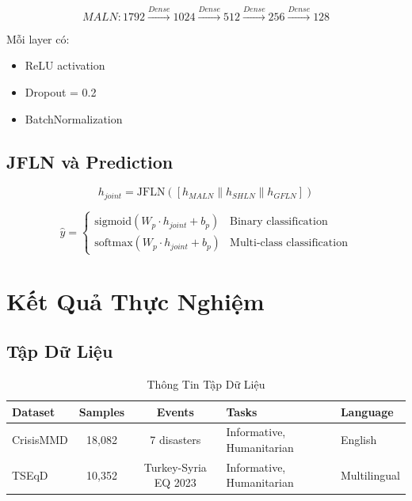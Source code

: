 \documentclass[12pt,a4paper]{article}
\begin{document}
\begin{equation}
MALN: 1792 \xrightarrow{Dense} 1024 \xrightarrow{Dense} 512 \xrightarrow{Dense} 256 \xrightarrow{Dense} 128
\end{equation}

Mỗi layer có:
\begin{itemize}
    \item ReLU activation
    \item Dropout = 0.2
    \item BatchNormalization
\end{itemize}

\subsection{JFLN và Prediction}

\begin{equation}
h_{joint} = \text{JFLN}([h_{MALN} \| h_{SHLN} \| h_{GFLN}])
\end{equation}

\begin{equation}
\hat{y} = \begin{cases}
\text{sigmoid}(W_p \cdot h_{joint} + b_p) & \text{Binary classification} \\
\text{softmax}(W_p \cdot h_{joint} + b_p) & \text{Multi-class classification}
\end{cases}
\end{equation}

\section{Kết Quả Thực Nghiệm}

\subsection{Tập Dữ Liệu}

\begin{table}[H]
\centering
\caption{Thông Tin Tập Dữ Liệu}
\label{tab:datasets}
\begin{tabular}{l|c|c|l|l}
\toprule
\textbf{Dataset} & \textbf{Samples} & \textbf{Events} & \textbf{Tasks} & \textbf{Language} \\
\midrule
CrisisMMD & 18,082 & 7 disasters & Informative, Humanitarian & English \\
TSEqD & 10,352 & Turkey-Syria EQ 2023 & Informative, Humanitarian & Multilingual \\
\bottomrule
\end{tabular}
\end{table}
\end{document}

